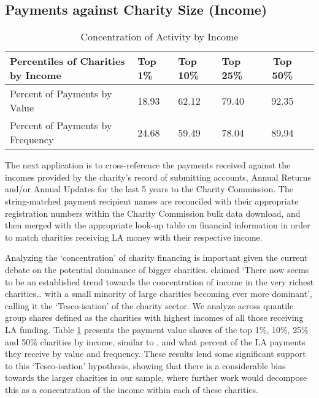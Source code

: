 \documentclass[12pt]{article}
\begin{document}
\subsection{Payments against Charity Size (Income)}

\begin{table}[!b]
\centering
\caption{Concentration of Activity by Income}
\label{concentrationtable}
\begin{tabular}{llllcc}\toprule
Percentiles of Charities by Income & Top 1\% & Top 10\% &  Top 25\% &  Top 50\% \\ \midrule
Percent of Payments by Value & 18.93 & 62.12 & 79.40 & 92.35 \\
Percent of Payments by Frequency & 24.68 & 59.49 & 78.04 & 89.94\\ \bottomrule
\end{tabular}
\end{table}

The next application is to cross-reference the payments received against the incomes provided by the charity's record of submitting accounts, Annual Returns and/or Annual Updates for the last 5 years to the Charity Commission. The string-matched payment recipient names are reconciled with their appropriate registration numbers within the Charity Commission bulk data download, and then merged with the appropriate look-up table on financial information in order to match charities receiving LA money with their respective income.

Analyzing the ‘concentration’ of charity financing is important given the current debate on the potential dominance of bigger charities. \cite{ids2005} claimed ‘There now seems to be an established trend towards the concentration of income in the very richest charities… with a small minority of large charities becoming ever more dominant’, calling it the `Tesco-isation’ of the charity sector. We analyze across quantile group shares defined as the charities with highest incomes of all those receiving LA funding. Table \ref{concentrationtable} presents the payment value shares of the top 1\%, 10\%, 25\% and 50\% charities by income, similar to \cite{backusandclifford2013}, and what percent of the LA payments they receive by value and frequency. These results lend some significant support to this `Tesco-isation' hypothesis, showing that there is a considerable bias towards the larger charities in our sample, where further work would decompose this as a concentration of the income within each of these charities.
\end{document}
